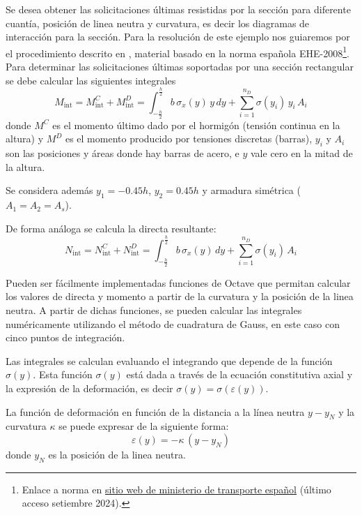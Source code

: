 Se desea obtener las solicitaciones últimas resistidas por la sección para diferente cuantía, posición de linea neutra y curvatura, es decir los diagramas de interacción para la sección. %
%
Para la resolución de este ejemplo nos guiaremos por el procedimiento descrito en \citep{JimenezMontoya}, material basado en la norma española EHE-2008\footnote{Enlace a norma en \href{https://www.transportes.gob.es/organos-colegiados/mas-organos-colegiados/comision-permanente-del-hormigon/cph/instrucciones/ehe-08-version-en-castellano}{sitio web de ministerio de transporte español} (último acceso setiembre 2024).}. %
%
Para determinar las solicitaciones últimas soportadas por una sección rectangular se debe calcular las siguientes integrales
%
\begin{equation}
M_{\text{int}} = M_{\text{int}}^C + M_{\text{int}}^D = \int_{-\frac{h}{2}}^{\frac{h}{2}} b \, \sigma_x(y) \, y \, dy + \sum_{i=1}^{n_D} \sigma(y_i) \, y_i \, A_i 
\end{equation}
%
donde $M^C$ es el momento último dado por el hormigón (tensión continua en la altura) y $M^D$ es el momento producido por tensiones discretas (barras), $y_i$ y $A_i$ son las posiciones y áreas donde hay barras de acero, e $y$ vale cero en la mitad de la altura. %
%

Se considera además $y_1=-0.45h$, $y_2=0.45h$ y armadura simétrica ($A_1 = A_2 = A_s$). %

De forma análoga se calcula la directa resultante:
%
\begin{equation}  
N_{\text{int}} = N_{\text{int}}^C + N_{\text{int}}^D = \int_{-\frac{h}{2}}^{\frac{h}{2}} b \, \sigma_x(y) \,  dy + \sum_{i=1}^{n_{D}} \sigma(y_i) \, A_i 
\end{equation}
%

Pueden ser fácilmente implementadas funciones de Octave que permitan calcular los valores de directa y momento a partir de la curvatura y la posición de la linea neutra. %
%
A partir de dichas funciones, se pueden calcular las integrales numéricamente utilizando el método de cuadratura de Gauss, en este caso con cinco puntos de integración. %

Las integrales se calculan evaluando el integrando que depende de la función $\sigma(y)$. %
%
Esta función $\sigma(y)$ está dada a través de la ecuación constitutiva axial y la expresión de la deformación, es decir $\sigma (y) = \sigma( \varepsilon ( y) )$. %

La función de deformación en función de la distancia a la línea neutra  $y - y_{N}$ y la curvatura $\kappa$ se puede expresar de la siguiente forma:
%
\begin{equation}
\varepsilon(y) = - \kappa \, (y - y_{N} ) 
\end{equation}
%
donde $y_N$ es la posición de la linea neutra.

